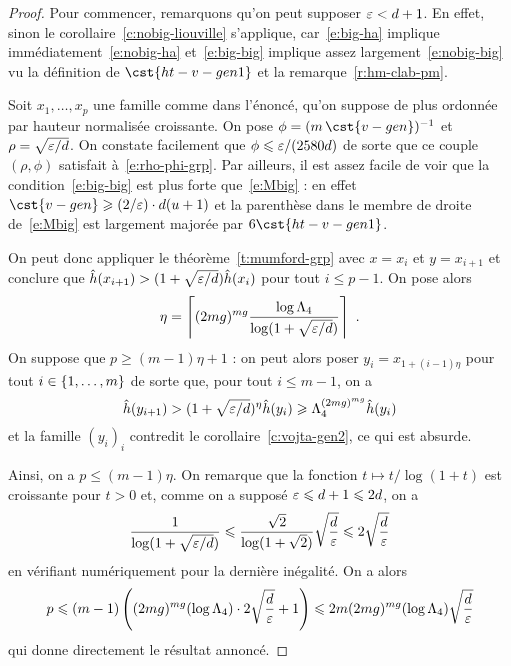 \begin{proof}
  Pour commencer, remarquons qu'on peut supposer \( \varepsilon < d + 1 \). En
  effet, sinon le corollaire~\vref{c:nobig-liouville} s'applique,
  car~\eqref{e:big-ha} implique immédiatement~\eqref{e:nobig-ha}
  et~\eqref{e:big-big} implique assez largement~\eqref{e:nobig-big} vu la
  définition de \( \cst{ht-v-gen1} \) et la remarque~\vref{r:hm-clab-pm}.

  Soit \( x_1, \dots, x_p \) une famille comme dans l'énoncé, qu'on suppose de
  plus ordonnée par hauteur normalisée croissante. On pose
  \( \phi =( m \, \cst{v-gen})^{-1} \) et
  \( \rho = \sqrt{ \varepsilon / d } \).  On constate facilement que
  \( \phi \leqslant \varepsilon / (2580 d) \) de sorte que ce couple \( (\rho, \phi) \)
  satisfait à~\eqref{e:rho-phi-grp}. Par ailleurs, il est assez facile de voir
  que la condition~\eqref{e:big-big} est plus forte que~\eqref{e:Mbig} : en
  effet \( \cst{v-gen} \ge (2/\eps) \cdot \adeg (\adim+1) \) et la parenthèse
  dans le membre de droite de~\eqref{e:Mbig} est largement majorée par \( 6
    \cst{ht-v-gen1} \).

  On peut donc appliquer le théorème~\vref{t:mumford-grp} avec \( x = x_i \)
  et \( y = x_{i+1} \) et conclure que
  \( \hat h ( x_{i+1} ) > (1 + \sqrt{\varepsilon / d}) \hat h ( x_i ) \) pour tout
  \( i \le p-1 \). On pose alors
  \begin{equation}
    \eta
    =
    \left\lceil
      (2mg)^{mg}
      \frac{ \log \Lambda_4 }{ \log (1 + \sqrt{\varepsilon / d}) }
    \right\rceil
    \text{ .}
  \end{equation}
  On suppose que \( p \ge (m-1) \eta + 1 \) : on peut alors poser
  \( y_i = x_{1 + (i-1) \eta} \) pour tout \( i \in \lbrace1, \dots, m\rbrace \) de
  sorte que, pour tout \( i \le m-1 \), on a
  \begin{equation}
    \hat h ( y_{i+1} )
    >
    (1 + \sqrt{\varepsilon / d})^\eta
    \hat h ( y_i )
    \geqslant
    \Lambda_4^{(2mg)^{mg}}
    \hat h ( y_i )
  \end{equation}
  et la famille \( (y_i)_i \) contredit le corollaire~\vref{c:vojta-gen2}, ce
  qui est absurde.

  Ainsi, on a \( p \le (m-1) \eta \). On remarque que la fonction \( t
    \mapsto t / \log(1+t) \) est croissante pour \( t > 0 \) et, comme on a
  supposé \( \varepsilon \leqslant d+1 \leqslant 2d \), on a
  \begin{equation}
    \frac1{ \log(1 + \sqrt{\varepsilon/d}) }
    \leqslant
    \frac{ \sqrt2 }{ \log(1 + \sqrt2) }
    \sqrt{ \frac d {\varepsilon} }
    \leqslant
    2 \sqrt{ \frac d {\varepsilon} }
  \end{equation}
  en vérifiant numériquement pour la dernière inégalité. On a alors
  \begin{equation}
    p
    \leqslant
    (m - 1)
    \left(
      (2mg)^{mg} (\log \Lambda_4)
      \cdot 2 \sqrt{ \frac d {\varepsilon} }
      + 1
    \right)
    \leqslant
    2 m
    (2mg)^{mg} (\log \Lambda_4)
    \sqrt{ \frac d {\varepsilon} }
  \end{equation}
  qui donne directement le résultat annoncé.
\end{proof}

